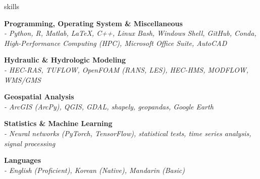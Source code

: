\documentclass{resume_anzy} %
\begin{document}

\begin{rSection}{skills}


\textbf{Programming, Operating System \& Miscellaneous}
\\ \textit{- Python, R, Matlab, \LaTeX, C++, Linux Bash, Windows Shell, GitHub, Conda, High-Performance Computing (HPC), Microsoft Office Suite, AutoCAD}

\textbf{Hydraulic \& Hydrologic Modeling} 
\\ \textit{- HEC-RAS, TUFLOW, OpenFOAM (RANS, LES), HEC-HMS, MODFLOW, WMS/GMS}

\textbf{Geospatial Analysis}
\\ \textit{- ArcGIS (ArcPy), QGIS, GDAL, shapely, geopandas, Google Earth}

\textbf{Statistics \& Machine Learning}
\\ \textit{- Neural networks (PyTorch, TensorFlow), statistical tests, time series analysis, signal processing}

\textbf{Languages}
\\ \textit{- English (Proficient), Korean (Native), Mandarin (Basic)}

\end{rSection}

%
%
\end{document}
